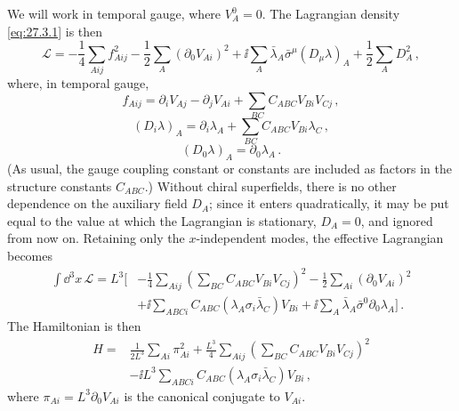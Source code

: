 We will work in temporal gauge, where \(V_A^0=0\). The Lagrangian density
\eqref{eq:27.3.1} is then
\begin{equation}
  \mathcal{L}
  =
  -\frac14\sum_{Aij}f_{Aij}^2
  -\frac12\sum_A(\partial_0V_{Ai})^2
  +\ii\sum_A\bar\lambda_A\bar\sigma^\mu(D_\mu\lambda)_A
  +\frac12\sum_A D_A^2\,,
  \tag{29.4.6}\label{eq:29.4.6}
\end{equation}
where, in temporal gauge,
\begin{equation}
  f_{Aij}
  =
  \partial_iV_{Aj}-\partial_jV_{Ai}
  +\sum_{BC}C_{ABC}V_{Bi}V_{Cj}\,,
  \tag{29.4.7}\label{eq:29.4.7}
\end{equation}
\begin{equation}
  (D_i\lambda)_A
  =
  \partial_i\lambda_A+\sum_{BC}C_{ABC}V_{Bi}\lambda_C\,,
  \tag{29.4.8}\label{eq:29.4.8}
\end{equation}
\begin{equation}
  (D_0\lambda)_A=\partial_0\lambda_A\,.
  \tag{29.4.9}\label{eq:29.4.9}
\end{equation}
(As usual, the gauge coupling constant or constants are included as factors
in the structure constants \(C_{ABC}\).) Without chiral superfields, there
is no other dependence on the auxiliary field \(D_A\); since it enters
quadratically, it may be put equal to the value at which the Lagrangian is
stationary, \(D_A=0\), and ignored from now on. Retaining only the
\(x\)-independent modes, the effective Lagrangian becomes
\begin{equation}
  \begin{aligned}
  \int \dd^3x\,\mathcal{L}
  =L^3\Bigg[
    &-\frac14\sum_{Aij}
      \left(\sum_{BC}C_{ABC}V_{Bi}V_{Cj}\right)^2
     -\frac12\sum_{Ai}(\partial_0V_{Ai})^2
  \\
    &+\ii\sum_{ABCi}
      C_{ABC}\left(\lambda_A\sigma_i\bar\lambda_C\right)V_{Bi}
     +\ii\sum_A\bar\lambda_A\bar\sigma^0\partial_0\lambda_A
  \Bigg]\,.
  \end{aligned}
  \tag{29.4.10}\label{eq:29.4.10}
\end{equation}
The Hamiltonian is then
\begin{equation}
  \begin{aligned}
  H={}&
  \frac{1}{2L^3}\sum_{Ai}\pi_{Ai}^2
  +\frac{L^3}{4}\sum_{Aij}
    \left(\sum_{BC}C_{ABC}V_{Bi}V_{Cj}\right)^2
  \\
  &-\ii L^3\sum_{ABCi}
    C_{ABC}\left(\lambda_A\sigma_i\bar\lambda_C\right)V_{Bi}\,,
  \end{aligned}
  \tag{29.4.11}\label{eq:29.4.11}
\end{equation}
where \(\pi_{Ai}=L^3\partial_0V_{Ai}\) is the canonical conjugate to
\(V_{Ai}\).

